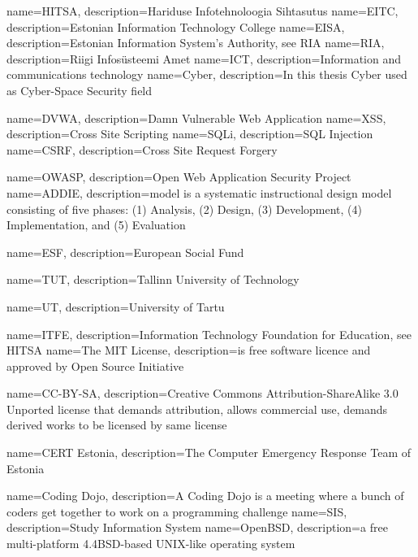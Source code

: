 {
  name=HITSA,
  description={Hariduse Infotehnoloogia Sihtasutus}
}
{
  name=EITC,
  description={Estonian Information Technology College}
}
{
  name=EISA,
  description={Estonian Information System’s Authority, see \gls{RIA}}
}
{
  name=RIA,
  description={Riigi Infosüsteemi Amet}
}
{
  name=ICT,
  description={Information and communications technology}
}
{
  name=Cyber,
  description={In this thesis Cyber used as Cyber-Space Security field}
}
 
{
  name=DVWA,
  description={Damn Vulnerable Web Application}
}
{
  name=XSS,
  description={Cross Site Scripting}
}
{
  name=SQLi,
  description={SQL Injection}
}
{
  name=CSRF,
  description={Cross Site Request Forgery}
}
 
{
  name=OWASP,
  description={Open Web Application Security Project}
}
{
  name=ADDIE,
  description={model is a systematic instructional design model consisting of five phases: (1) Analysis, (2) Design, (3) Development, (4) Implementation, and (5) Evaluation}
} 


{
  name=ESF,
  description={European Social Fund}
} 


{
  name=TUT,
  description={Tallinn University of Technology}
} 


{
  name=UT,
  description={University of Tartu}
} 


{
  name=ITFE,
  description={Information Technology Foundation for Education, see \gls{HITSA}}
} 
{
  name=The MIT License,
  description={is free software licence and approved by Open Source Initiative}
} 


{
  name=CC-BY-SA,
  description={Creative Commons Attribution-ShareAlike 3.0 Unported license that demands attribution, allows commercial use, demands derived works to be licensed by same license}
} 


{
  name=CERT Estonia,
  description={The Computer Emergency Response Team of Estonia}
}

{
  name=Coding Dojo,
  description={A Coding Dojo is a meeting where a bunch of coders get together to work on a programming challenge}
}
{
  name=SIS,
  description={Study Information System}
}
{
  name=OpenBSD,
  description={a free multi-platform 4.4BSD-based UNIX-like operating system}
}

